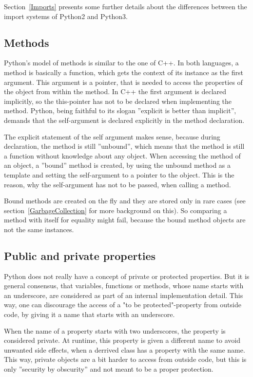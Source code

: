 			Section~\ref{Imports} presents some further details about the differences between the import systems of Python2 and Python3.

		\subsection{Methods}
			Python's model of methods is similar to the one of C++.
			In both languages, a method is basically a function, which gets the context of its instance as the first argument.
			This argument is a pointer, that is needed to access the properties of the object from within the method.
			In C++ the first argument is declared implicitly, so the {\normalfont \ttfamily this}-pointer has not to be declared when implementing the method.
			Python, being faithful to its slogan ''explicit is better than implicit'', demands that the {\normalfont \ttfamily self}-argument is declared explicitly in the method declaration.

			The explicit statement of the {\normalfont \ttfamily self} argument makes sense, because during declaration, the method is still ''unbound'', which means that the method is still a function without knowledge about any object.
			When accessing the method of an object, a ''bound'' method is created, by using the unbound method as a template and setting the {\normalfont \ttfamily self}-argument to a pointer to the object.
			This is the reason, why the {\normalfont \ttfamily self}-argument has not to be passed, when calling a method.

			Bound methods are created on the fly and they are stored only in rare cases (see section~\ref{GarbageCollection} for more background on this).
			So comparing a method with itself for equality might fail, because the bound method objects are not the same instances.

		\subsection{Public and private properties}
			Python does not really have a concept of private or protected properties.
			But it is general consensus, that variables, functions or methods, whose name starts with an underscore, are considered as part of an internal implementation detail.
			This way, one can discourage the access of a "to be protected"-property from outside code, by giving it a name that starts with an underscore.

			When the name of a property starts with two underscores, the property is considered private.
			At runtime, this property is given a different name to avoid unwanted side effects, when a derrived class has a property with the same name.
			This way, private objects are a bit harder to access from outside code, but this is only ''security by obscurity'' and not meant to be a proper protection.

